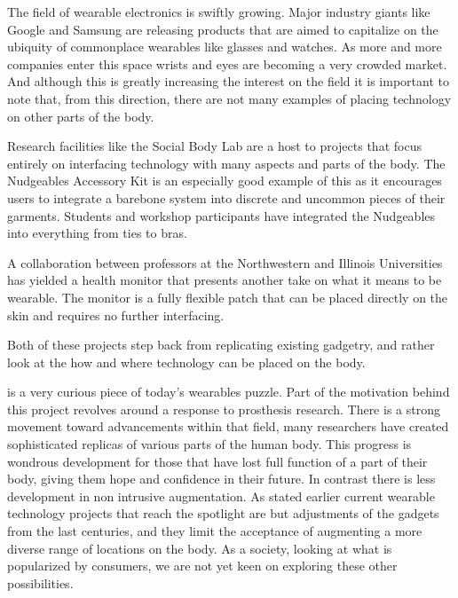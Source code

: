 
The field of wearable electronics is swiftly growing. Major industry giants like Google and Samsung are releasing products that are aimed to capitalize on the ubiquity of commonplace wearables like glasses and watches. As more and more companies enter this space wrists and eyes are becoming a very crowded market. And although this is greatly increasing the interest on the field it is important to note that, from this direction, there are not many examples of placing technology on other parts of the body.

Research facilities like the Social Body Lab are a host to projects that focus entirely on interfacing technology with many aspects and parts of the body. The Nudgeables Accessory Kit is an especially good example of this as it encourages users to integrate a barebone system into discrete and uncommon pieces of their garments. Students and workshop participants have integrated the Nudgeables into everything from ties to bras. 

A collaboration between professors at the Northwestern and Illinois Universities has yielded a health monitor that presents another take on what it means to be wearable. The monitor is a fully flexible patch that can be placed directly on the skin and requires no further interfacing. 

Both of these projects step back from replicating existing gadgetry, and rather look at the how and where technology can be placed on the body. 

 is a very curious piece of today's wearables puzzle. Part of the motivation behind this project revolves around a response to prosthesis research. There is a strong movement toward advancements within that field, many researchers have created sophisticated replicas of various parts of the human body. This progress is wondrous development for those that have lost full function of a part of their body, giving them hope and confidence in their future. In contrast there is less development in non intrusive augmentation. As stated earlier current wearable technology projects that reach the spotlight are but adjustments of the gadgets from the last centuries, and they limit the acceptance of augmenting a more diverse range of locations on the body. As a society, looking at what is popularized by consumers, we are not yet keen on exploring these other possibilities.

